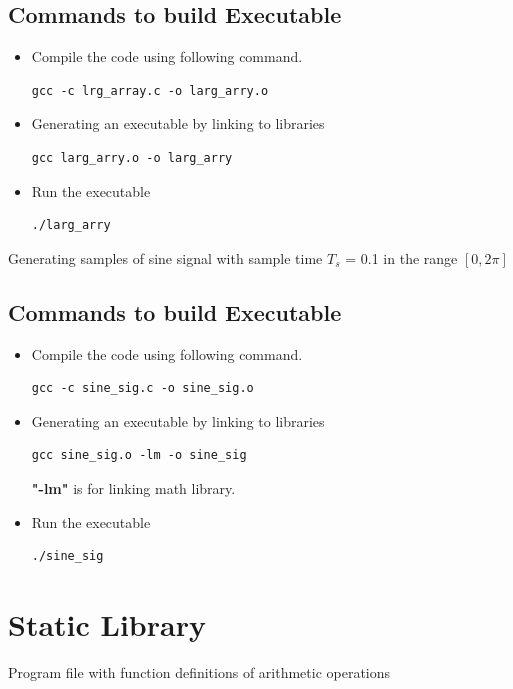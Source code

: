 \documentclass[conference]{IEEEtran}
\begin{document}
\subsection*{Commands to build Executable}
\begin{itemize}
\item Compile the code using following command.
\begin{lstlisting}
gcc -c lrg_array.c -o larg_arry.o
\end{lstlisting}

\item Generating an executable by linking to libraries
\begin{lstlisting}
gcc larg_arry.o -o larg_arry
\end{lstlisting}

\item Run the executable 
\begin{lstlisting}
./larg_arry
\end{lstlisting}

\end{itemize}

\program
Generating samples of sine signal with sample time $T_s$ = 0.1 in the range $[0, 2\pi]$ 


\subsection*{Commands to build Executable}
\begin{itemize}
\item
Compile the code using following command.
\begin{lstlisting}
gcc -c sine_sig.c -o sine_sig.o
\end{lstlisting}
\item 
Generating an executable by linking to libraries
\begin{lstlisting}
gcc sine_sig.o -lm -o sine_sig
\end{lstlisting}
\textbf{"-lm"} is for linking math library.
\item 
Run the executable 
\begin{lstlisting}
./sine_sig
\end{lstlisting}

\end{itemize}

\section{Static Library}
\program
Program file with function definitions of arithmetic operations

\end{document}
